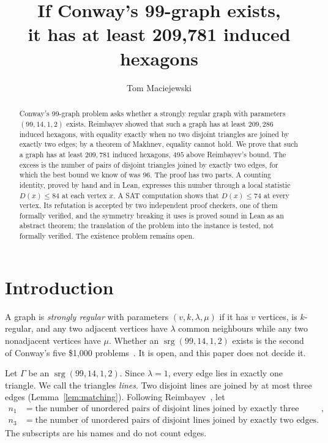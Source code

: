 \documentclass[11pt]{amsart}
\title[Hexagons in a Conway 99-graph]{If Conway's 99-graph exists,\\ it has at least 209,781 induced hexagons}
\author{Tom Maciejewski}
\theoremstyle{remark}
\newcommand{\srg}{\operatorname{srg}}
\begin{document}
\begin{abstract}
Conway's 99-graph problem asks whether a strongly regular graph with
parameters $(99,14,1,2)$ exists. Reimbayev showed that such a graph has at
least $209{,}286$ induced hexagons, with equality exactly when no two disjoint
triangles are joined by exactly two edges; by a theorem of Makhnev, equality
cannot hold. We prove that such a graph has at least $209{,}781$ induced
hexagons, $495$ above Reimbayev's bound. The excess is the number of pairs of
disjoint triangles joined by exactly two edges, for which the best bound we
know of was $96$. The proof has two parts. A counting identity, proved by hand
and in Lean, expresses this number through a local statistic $D(x)\le84$ at
each vertex $x$. A SAT computation shows that $D(x)\le74$ at every vertex. Its
refutation is accepted by two independent proof checkers, one of them formally
verified, and the symmetry breaking it uses is proved sound in Lean as an
abstract theorem; the translation of the problem into the instance is tested,
not formally verified. The existence problem remains open.
\end{abstract}

\maketitle

\section{Introduction}

A graph is \emph{strongly regular} with parameters $(v,k,\lambda,\mu)$ if it
has $v$ vertices, is $k$-regular, and any two adjacent vertices have $\lambda$
common neighbours while any two nonadjacent vertices have $\mu$. Whether an
$\srg(99,14,1,2)$ exists is the second of Conway's five \$1{,}000
problems~\cite{Conway}. It is open, and this paper does not decide it.

Let $\Gamma$ be an $\srg(99,14,1,2)$. Since $\lambda=1$, every edge lies in
exactly one triangle. We call the triangles \emph{lines}. Two disjoint lines
are joined by at most three edges (Lemma~\ref{lem:matching}). Following
Reimbayev~\cite{Reimbayev}, let
\begin{align*}
  n_1&=\text{the number of unordered pairs of disjoint lines joined by exactly three edges},\\
  n_3&=\text{the number of unordered pairs of disjoint lines joined by exactly two edges}.
\end{align*}
The subscripts are his names and do not count edges.
\end{document}
